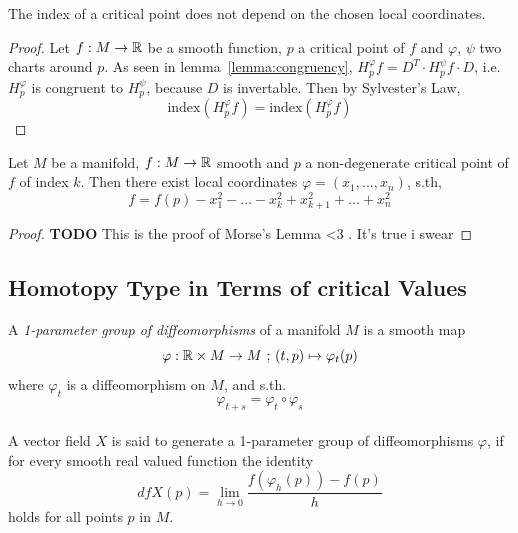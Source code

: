\documentclass[a4paper,11pt]{article}
\begin{document}
\begin{lemma}
   \label{lemma:index}
   The index of a critical point does not depend on the chosen local coordinates.
\end{lemma}

\begin{proof}
   Let $f: M \rightarrow {\mathbb R}$ be a smooth function, $p$ a critical point of $f$
   and $\varphi$, $\psi$ two charts around $p$.
   As seen in lemma~\ref{lemma:congruency}, $H_p^{\varphi}f = D^T \cdot H_p^{\psi}f \cdot D$, i.e.
   $H_p^{\varphi}$ is congruent to $H_p^{\psi}$, because $D$ is invertable. Then by Sylvester's Law, 
   \[ \text{{index}}(H_p^{\varphi}f) = \text{{index}}(H_p^{\varphi}f) \]
\end{proof}

\begin{theorem}
   \label{theorem:morse lemma}

   Let $M$ be a manifold, $f: M \rightarrow {\mathbb R}$ smooth and $p$ a non-degenerate 
   critical point of $f$ of index $k$. Then there exist local coordinates $\varphi = (x_1, ..., x_n)$, s.th,
   \[ f = f(p) - x_1^2 - ... - x_k^2 + x_{k+1}^2 + ... + x_n^2 \]
\end{theorem}

\begin{proof}
   \textbf{TODO}
   This is the proof of Morse's Lemma <3 . It's true i swear
\end{proof}

\subsection{Homotopy Type in Terms of critical Values}

\begin{definition}
   \label{def:1-param group}
   A \textit{1-parameter group of diffeomorphisms} of a manifold $M$ is a smooth map
   \[ \varphi: {\mathbb R} \times M \rightarrow M \text{ ; } (t, p) \mapsto \varphi_t(p) \]
   where $ \varphi_t $ is a diffeomorphism on $M$, and s.th. \[ \varphi_{t+s} = \varphi_t \circ \varphi_s \] \\
   A vector field $X$ is said to generate a 1-parameter group of diffeomorphisms $ \varphi $, if for every
   smooth real valued function the identity 
   \[ dfX(p) = \lim_{h \to 0} \frac{f(\varphi_h(p)) - f(p)}{h} \]
   holds for all points $p$ in $M$.
\end{definition}
\end{document}
